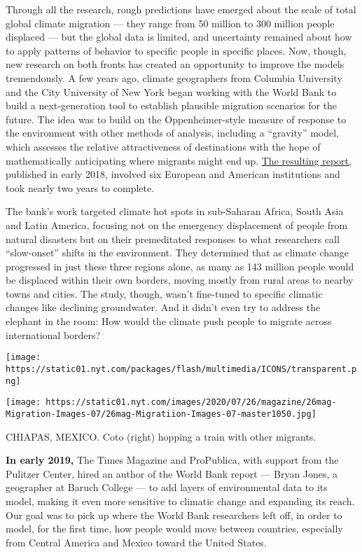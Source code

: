 Through all the research, rough predictions have emerged about the scale
of total global climate migration --- they range from 50 million to 300
million people displaced --- but the global data is limited, and
uncertainty remained about how to apply patterns of behavior to specific
people in specific places. Now, though, new research on both fronts has
created an opportunity to improve the models tremendously. A few years
ago, climate geographers from Columbia University and the City
University of New York began working with the World Bank to build a
next-generation tool to establish plausible migration scenarios for the
future. The idea was to build on the Oppenheimer-style measure of
response to the environment with other methods of analysis, including a
``gravity'' model, which assesses the relative attractiveness of
destinations with the hope of mathematically anticipating where migrants
might end up.
\href{https://www.worldbank.org/en/news/infographic/2018/03/19/groundswell---preparing-for-internal-climate-migration}{The
resulting report,} published in early 2018, involved six European and
American institutions and took nearly two years to complete.

The bank's work targeted climate hot spots in sub-Saharan Africa, South
Asia and Latin America, focusing not on the emergency displacement of
people from natural disasters but on their premeditated responses to
what researchers call ``slow-onset'' shifts in the environment. They
determined that as climate change progressed in just these three regions
alone, as many as 143 million people would be displaced within their own
borders, moving mostly from rural areas to nearby towns and cities. The
study, though, wasn't fine-tuned to specific climatic changes like
declining groundwater. And it didn't even try to address the elephant in
the room: How would the climate push people to migrate across
international borders?

\texttt{[image: https://static01.nyt.com/packages/flash/multimedia/ICONS/transparent.png]}

\texttt{[image: https://static01.nyt.com/images/2020/07/26/magazine/26mag-Migration-Images-07/26mag-Migratiion-Images-07-master1050.jpg]}

CHIAPAS, MEXICO. Coto (right) hopping a train with other migrants.

\textbf{In early 2019,} The Times Magazine and ProPublica, with support
from the Pulitzer Center, hired an author of the World Bank report ---
Bryan Jones, a geographer at Baruch College --- to add layers of
environmental data to its model, making it even more sensitive to
climatic change and expanding its reach. Our goal was to pick up where
the World Bank researchers left off, in order to model, for the first
time, how people would move between countries, especially from Central
America and Mexico toward the United States.

